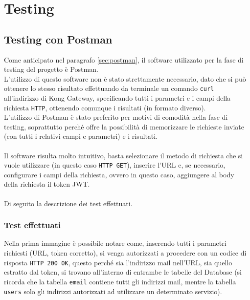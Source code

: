 \chapter{Testing}\label{chapter:testing}
\section{Testing con Postman}\label{sec:test1}
Come anticipato nel paragrafo \ref{sec:postman}, il software utilizzato per la fase di testing del progetto è Postman.\\
L'utilizzo di questo software non è stato strettamente necessario, dato che si può ottenere lo stesso risultato effettuando da terminale un comando \texttt{curl}
all'indirizzo di Kong Gateway, specificando tutti i parametri e i campi della richiesta \texttt{HTTP}, ottenendo comunque i risultati (in formato diverso).\\
L'utilizzo di Postman è stato preferito per motivi di comodità nella fase di testing, soprattutto perché offre la possibilità di memorizzare le richieste inviate 
(con tutti i relativi campi e parametri) e i risultati.\\ \\
Il software risulta molto intuitivo, basta selezionare il metodo di richiesta che si vuole utilizzare (in questo caso \texttt{HTTP GET}), 
inserire l'URL e, se necessario, configurare i campi della richiesta, ovvero in questo caso, aggiungere al body della richiesta il token JWT. \cite{Postman }\\ \\

Di seguito la descrizione dei test effettuati.\\

\subsection{Test effettuati}\label{subsec:testeffettuati}

Nella prima immagine è possibile notare come, inserendo tutti i parametri richiesti (URL, token corretto), si venga autorizzati a procedere con un codice di risposta
\texttt{HTTP 200 OK}, questo perché sia l'indirizzo mail nell'URL, sia quello estratto dal token, si trovano all'interno di entrambe le tabelle del Database 
(si ricorda che la tabella \texttt{email} contiene tutti gli indirizzi mail, mentre la tabella \texttt{users} solo gli indirizzi autorizzati ad utilizzare un determinato servizio).

